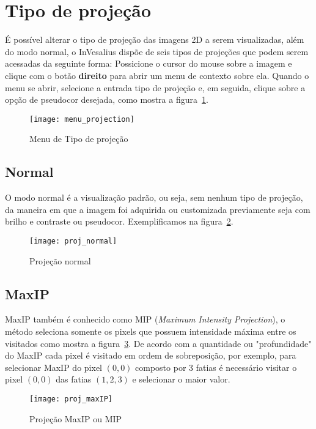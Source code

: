 \newpage

\section{Tipo de projeção}

É possível alterar o tipo de projeção das imagens 2D a serem visualizadas, além do modo normal, o InVesalius dispõe de seis tipos de projeções que podem serem acessadas da seguinte forma: Possicione o cursor do mouse sobre a imagem e clique com o botão \textbf{direito} para abrir um menu de contexto sobre ela. Quando o menu se abrir, selecione a entrada tipo de projeção e, em seguida, clique sobre a opção de pseudocor desejada, como mostra a figura~\ref{fig:menu_proj}.

\begin{figure}[H]
\centering
\texttt{[image: menu\_projection]}
\caption{Menu de Tipo de projeção}
\label{fig:menu_proj}
\end{figure}

\subsection{Normal}

O modo normal é a visualização padrão, ou seja, sem nenhum tipo de projeção, da maneira em que a imagem foi adquirida ou customizada previamente seja com brilho e contraste ou pseudocor. Exemplificamos na figura~\ref{fig:proj_normal}.

\begin{figure}[H]
\centering
\texttt{[image: proj\_normal]}
\caption{Projeção normal}
\label{fig:proj_normal}
\end{figure}

\subsection{MaxIP}

MaxIP também é conhecido como MIP (\textit{Maximum Intensity Projection}), o método seleciona somente os pixels que possuem intensidade máxima entre os visitados como mostra a figura~\ref{fig:proj_maxip}. De acordo com a quantidade ou "profundidade" do MaxIP cada pixel é visitado em ordem de sobreposição, por exemplo, para selecionar MaxIP do pixel $(0,0)$ composto por 3 fatias é necessário visitar o pixel $(0,0)$ das fatias $(1,2,3)$ e selecionar o maior valor.

\begin{figure}[H]
\centering
\texttt{[image: proj\_maxIP]}
\caption{Projeção MaxIP ou MIP}
\label{fig:proj_maxip}
\end{figure}

